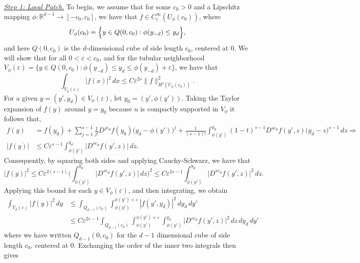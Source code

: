 \documentclass[aos]{imsart}
\theoremstyle{plain}
\theoremstyle{definition}
\theoremstyle{remark}
\def\R{\mathbb{R}}
\newcommand{\Reals}{\mathbb{R}} %
\newcommand{\1}{\mathbf{1}}
\begin{document}
\underline{\textit{Step 1: Local Patch.}}
To begin, we assume that for some $c_0 > 0$ and a Lipschitz mapping $\phi: \Reals^{d - 1} \to [-c_0,c_0]$, we have that $f \in C_c^{\infty}(U_{\phi}(c_0))$, where 
\begin{equation*}
U_{\phi}(c_0) = \Bigl\{y \in Q(0,c_0): \phi(y_{-d}) \leq y_d\Bigr\}, 
\end{equation*}
and here $Q(0,c_0)$ is the $d$-dimensional cube of side length $c_0$, centered at $0$. We will show that for all $0 < \varepsilon < c_0$, and for the tubular neighborhood $V_{\phi}(\varepsilon) = \{y \in Q(0,c_0): \phi(y_{-d}) \leq y_d \leq \phi(y_{-d}) + \varepsilon\}$, we have that
\begin{equation*}
\int_{V_{\phi}(\varepsilon)} |f(x)|^2 \,dx \leq C\varepsilon^{2s} \|f\|_{H^s(U_{\phi}(c_0))}^2.
\end{equation*}
For a given $y = (y',y_d) \in V_{\phi}(\varepsilon)$, let $y_0 = (y',\phi(y'))$. Taking the Taylor expansion of $f(y)$ around $y = y_0$ because $u$ is compactly supported in $V_{\phi}$ it follows that,
\begin{align*}
f(y) & = f(y_0) + \sum_{j = 1}^{s - 1} \frac{1}{j!} D^{je_d}f(y_0) \bigl(y_d - \phi(y')\bigr)^j + \frac{1}{(s - 1)!}\int_{\phi(y')}^{y_d} (1 - t)^{s - 1} D^{se_d}f(y',z) \bigl(y_d - z\bigr)^{s - 1} \,dz \Longrightarrow\\
|f(y)| & \leq C\varepsilon^{s - 1}\int_{\phi(y')}^{y_d} \bigl|D^{se_d}f(y',z)\bigr| \,dz. 
\end{align*}
Consequently, by squaring both sides and applying Cauchy-Schwarz, we have that
\begin{equation*}
|f(y)|^2 \leq C\varepsilon^{2(s - 1)} \biggl(\int_{\phi(y')}^{y_d} \bigl|D^{se_d}f(y',z)\bigr| \,dz\biggr)^2 \leq C\varepsilon^{2s - 1} \int_{\phi(y')}^{y_d} \bigl|D^{se_d}f(y',z)\bigr|^2 \,dz.
\end{equation*}
Applying this bound for each $y \in V_{\phi}(\varepsilon)$, and then integrating, we obtain
\begin{align}
\int_{V_{\phi}(\varepsilon)} |f(y)|^2 \,dy & \leq \int_{Q_{d - 1}(c_0)} \int_{\phi(y')}^{\phi(y') + \varepsilon} |f(y',y_d)|^2 \,dy_d \,dy' \nonumber \\
& \leq C\varepsilon^{2s - 1}\int_{Q_{d - 1}(c_0)}  \int_{\phi(y')}^{\phi(y') + \varepsilon} \int_{\phi(y')}^{y_d} \bigl|D^{se_d}f(y',z)\bigr|^2 \,dz \,dy_d \,dy' \label{pf:approximation_error_nonlocal_laplacian_boundary_1}
\end{align}
where we have written $Q_{d - 1}(0,c_0)$ for the $d - 1$ dimensional cube of side length $c_0$, centered at $0$. Exchanging the order of the inner two integrals then gives
\end{document}

